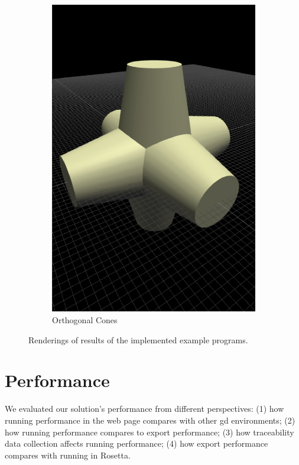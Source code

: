 \begin{figure}
\begin{subfigure}[b]{0.3\linewidth}
    \includegraphics[width=1.0\linewidth]{./images/all_examples/ortho_cones_crop}
    \caption{Orthogonal Cones}
    \label{fig:ex:ortho:cones}
  \end{subfigure}

  \caption{Renderings of results of the implemented example programs.}
  \label{fig:all:examples}
\end{figure}




\section{Performance}
\label{sec:eval:performance}
We evaluated our solution's performance from different perspectives:
(1) how running performance in the web page compares with other \gls{gd} environments;
(2) how running performance compares to export performance;
(3) how traceability data collection affects running performance;
(4) how export performance compares with running in Rosetta.

